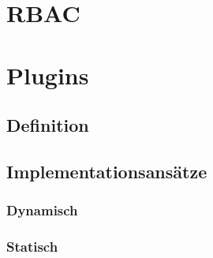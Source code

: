 \section{\acl{RBAC}}
\section{Plugins}
\subsection{Definition}
\subsection{Implementationsansätze}
\subsubsection{Dynamisch}
\subsubsection{Statisch}
